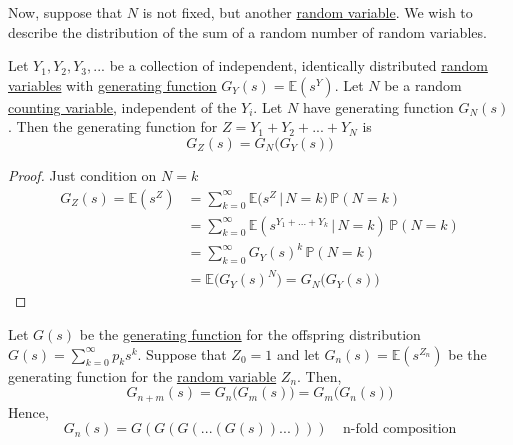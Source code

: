     Now, suppose that $N$ is not fixed, but another \hyperref[def:random-variable]{random variable}. We wish to describe the distribution of the sum of a random number of random variables. 

    \begin{lemma}
      \label{thm:generating-function-of-a-randomly-stopped-sum}
      Let $Y_1, Y_2, Y_3, ...$ be a collection of independent, identically distributed \hyperref[def:random-variable]{random variables} with \hyperref[def:generating-function]{generating function} $G_Y (s) = \mathbb{E}(s^Y)$. Let $N$ be a random \hyperref[def:counting-variable]{counting variable}, independent of the $Y_i$. Let $N$ have generating function $G_N (s)$. Then the generating function for $Z = Y_1 + Y_2 + ... + Y_N$ is 
      \begin{equation}
        G_Z (s) = G_N \big( G_Y (s) \big)
      \end{equation}
    \end{lemma}
    \begin{proof}
      Just condition on $N = k$ 
      \begin{align*}
        G_Z (s) = \mathbb{E}(s^Z) & = \sum_{k=0}^\infty \mathbb{E}\big( s^Z \,|\, N=k\big) \, \mathbb{P}(N=k) \\
        & = \sum_{k=0}^\infty \mathbb{E}(s^{Y_1 + ... + Y_k} \,|\,N=k) \, \mathbb{P}(N=k) \\
        & = \sum_{k=0}^\infty G_Y (s)^k \, \mathbb{P}(N=k) \\
        & = \mathbb{E}\big( G_Y (s)^N \big) = G_N \big( G_Y (s) \big)
      \end{align*}
    \end{proof}

    \begin{theorem}
      \label{thm:extinction-probability-from-the-offspring}
      Let $G(s)$ be the \hyperref[def:generating-function]{generating function} for the offspring distribution $G(s) = \sum_{k=0}^\infty p_k s^k$. Suppose that $Z_0 = 1$ and let $G_n (s) = \mathbb{E}(s^{Z_n})$ be the generating function for the \hyperref[def:random-variable]{random variable} $Z_n$. Then, 
      \begin{equation}
        G_{n+m} (s) = G_n \big(G_m (s)\big) = G_m \big( G_n (s) \big)
      \end{equation}
      Hence, 
      \begin{equation}
        G_n (s) = G(G(G(...(G(s))...))) \;\;\;\; \text{n-fold composition}
      \end{equation}
    \end{theorem}

